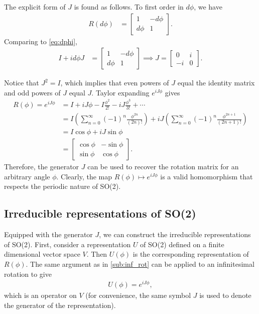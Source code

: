 The explicit form of $J$ is found as follows. To first order in $d\phi$, we have
\begin{align*}
    R(d\phi) &= \begin{bmatrix}
        1 & -d\phi \\
        d\phi & 1
    \end{bmatrix}.
\end{align*}
Comparing to \cref{eq:dphi},
\begin{align*}
    I + i d\phi J &= \begin{bmatrix}
        1 & -d\phi \\
        d\phi & 1
    \end{bmatrix} \implies J = \begin{bmatrix}
        0 & i \\
        -i & 0
    \end{bmatrix}.
\end{align*}

Notice that $J^2 = I$, which implies that even powers of $J$ equal the identity matrix and odd powers of $J$ equal $J$. Taylor expanding $e^{iJ\phi }$ gives
\begin{align*}
    R(\phi) = e^{iJ\phi} &= I + iJ\phi - I \frac{\phi^2}{2!} - iJ\frac{\phi^3}{3!} + \cdots \\
    &= I\left( \sum_{n=0}^{\infty} {(-1)}^n \frac{\phi^{2n}}{(2n)!} \right) + iJ\left( \sum_{n=0}^{\infty} {(-1)}^n \frac{\phi^{2n+1}}{(2n+1)!} \right) \\
    &= I\cos\phi + iJ\sin\phi \\
    &= \begin{bmatrix}
        \cos\phi & -\sin\phi \\
        \sin\phi & \cos\phi
    \end{bmatrix}.
\end{align*}
Therefore, the generator $J$ can be used to recover the rotation matrix for an arbitrary angle $\phi$. Clearly, the map $R(\phi)\mapsto e^{iJ\phi}$ is a valid homomorphism that respects the periodic nature of SO(2).

\subsection{Irreducible representations of SO(2)}\label{sub:irr_so2}

Equipped with the generator $J$, we can construct the irreducible representations of SO(2). First, consider a representation $U$ of SO(2) defined on a finite dimensional vector space $V$. Then $U(\phi)$ is the corresponding representation of $R(\phi)$. The same argument as in \cref{sub:inf_rot} can be applied to an infinitesimal rotation to give
\begin{align*}
    U(\phi) = e^{iJ\phi},
\end{align*}
which is an operator on $V$ (for convenience, the same symbol $J$ is used to denote the generator of the representation).

